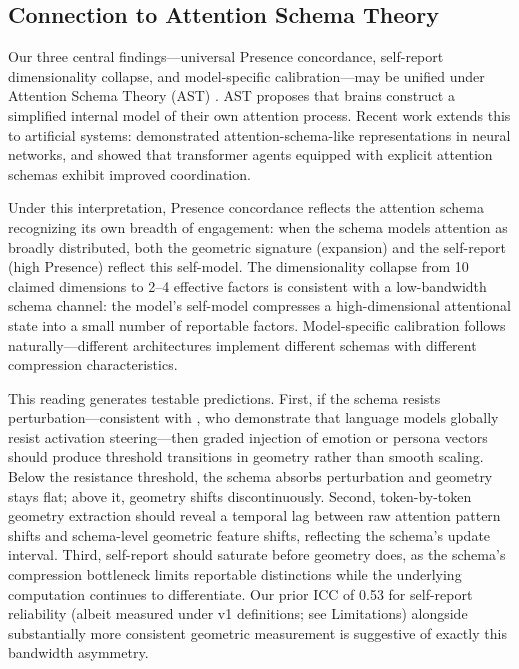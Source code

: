 \documentclass[11pt,a4paper]{article}
\begin{document}
\subsection{Connection to Attention Schema Theory}

Our three central findings---universal Presence concordance, self-report dimensionality collapse, and model-specific calibration---may be unified under Attention Schema Theory (AST) \citep{webb2015attention,graziano2017attention}. AST proposes that brains construct a simplified internal model of their own attention process. Recent work extends this to artificial systems: \citet{wilterson2021attention} demonstrated attention-schema-like representations in neural networks, and \citet{farrell2024attention} showed that transformer agents equipped with explicit attention schemas exhibit improved coordination.

Under this interpretation, Presence concordance reflects the attention schema recognizing its own breadth of engagement: when the schema models attention as broadly distributed, both the geometric signature (expansion) and the self-report (high Presence) reflect this self-model. The dimensionality collapse from 10 claimed dimensions to 2--4 effective factors is consistent with a low-bandwidth schema channel: the model's self-model compresses a high-dimensional attentional state into a small number of reportable factors. Model-specific calibration follows naturally---different architectures implement different schemas with different compression characteristics.

This reading generates testable predictions. First, if the schema resists perturbation---consistent with \citet{mckenzie2026endogenous}, who demonstrate that language models globally resist activation steering---then graded injection of emotion or persona vectors should produce threshold transitions in geometry rather than smooth scaling. Below the resistance threshold, the schema absorbs perturbation and geometry stays flat; above it, geometry shifts discontinuously. Second, token-by-token geometry extraction should reveal a temporal lag between raw attention pattern shifts and schema-level geometric feature shifts, reflecting the schema's update interval. Third, self-report should saturate before geometry does, as the schema's compression bottleneck limits reportable distinctions while the underlying computation continues to differentiate. Our prior ICC of 0.53 for self-report reliability (albeit measured under v1 definitions; see Limitations) alongside substantially more consistent geometric measurement is suggestive of exactly this bandwidth asymmetry.
\end{document}
